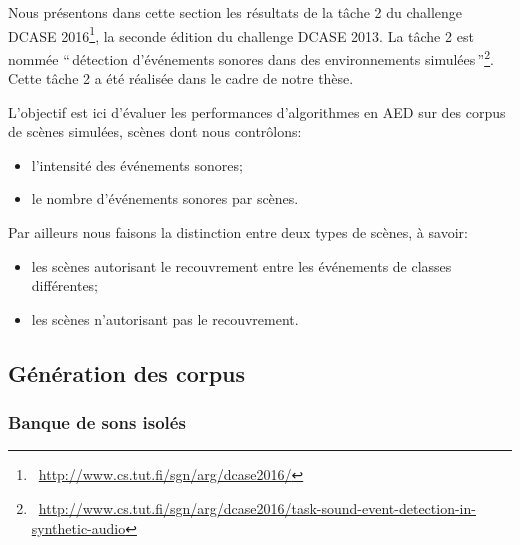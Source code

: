 Nous présentons dans cette section les résultats de la tâche 2 du challenge DCASE 2016\footnote{\cf~\url{http://www.cs.tut.fi/sgn/arg/dcase2016/}}, la seconde édition du challenge DCASE 2013. La tâche 2 est nommée ``\,détection d'événements sonores dans des environnements simulées\,''\footnote{\cf~\url{http://www.cs.tut.fi/sgn/arg/dcase2016/task-sound-event-detection-in-synthetic-audio}}. Cette tâche 2 a été réalisée dans le cadre de notre thèse. 

L'objectif est ici d'évaluer les performances d'algorithmes en AED sur des corpus de scènes simulées, scènes dont nous contrôlons:

\begin{itemize}
\item l'intensité des événements sonores;
\item le nombre d'événements sonores par scènes.
\end{itemize}

Par ailleurs nous faisons la distinction entre deux types de scènes, à savoir:

\begin{itemize}
\item les scènes autorisant le recouvrement entre les événements de classes différentes;
\item les scènes n'autorisant pas le recouvrement.
\end{itemize}

\subsection{Génération des corpus}

\subsubsection{Banque de sons isolés}

